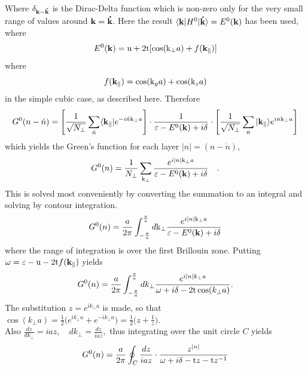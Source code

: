 \documentclass[a4paper, 12pt]{article}
\begin{document}
Where $\delta_{\bf k-\acute{k}}$ is the Dirac-Delta function which is non-zero only for the very small range of values around $\bf k = \acute{k}$. Here the result $\langle {\bf k}|H^0|{\bf \acute{k}} \rangle = E^0 ({\bf k}) $ has been used, where
\begin{equation}
	E^0 ({\bf k})={\rm{u}}+2{\rm{t}}[\cos({\rm{k}}_\perp a)+f({\bf k_\parallel})]
\end{equation}
where
\begin{equation}\label{disp}
	f({\bf k_\parallel}) = \cos({\rm{k}}_y a)+\cos({\rm{k}}_z a)
\end{equation}
in the simple cubic case, as described here. Therefore
\begin{equation}
	G^0(n - \acute{n}) = \left[ \frac{1}{\sqrt{N_\perp}}\sum_{\acute{n}} \langle{\bf k_\parallel}|e^{-i\acute{n}{\rm{k}}_\perp a}\right]\cdot \frac{1}{\varepsilon-E^0 ({\bf k}) +i\delta} \cdot \left[ \frac{1}{\sqrt{N_\perp}}\sum_n |{\bf k_\parallel}\rangle e^{in{\rm{k}}_\perp a}\right]
\end{equation}
which yields the Green's function for each layer $|n| = (n-\acute{n})$,
\begin{equation}
	G^0 (n) = \frac{1}{N_\perp}\sum_{{\rm{k}}_\perp} \frac{e^{i|n|{\rm{k}}_\perp a}}{\varepsilon-E^0 ({\bf k}) +i\delta} \quad .
\end{equation}
This is solved most conveniently by converting the summation to an integral and solving by contour integration.
\begin{equation}
	G^0 (n) = \frac{a}{2\pi}\int_{-\frac{\pi}{a}}^{\frac{\pi}{a}} {d{\rm{k}}_\perp} \frac{e^{i|n|{\rm{k}}_\perp a}}{\varepsilon-E^0 ({\bf k}) +i\delta}
\end{equation}
where the range of integration is over the first Brillouin zone. Putting $\omega = \varepsilon -{\rm u} -2{\rm t}f({\bf k_\parallel})$ yields
\begin{equation}
	G^0 (n) = \frac{a}{2\pi}\int_{-\frac{\pi}{a}}^{\frac{\pi}{a}} {dk_\perp} \frac{e^{i|n|k_\perp a}}{\omega +i\delta - 2{\rm t}\cos(k_\perp a)} .
\end{equation}
The substitution $z=e^{ik_\perp a}$ is made, so that $\cos(k_\perp a) = \frac{1}{2}\big(e^{ik_\perp a}+e^{-ik_\perp a}\big)= \frac{1}{2}\big(z +\frac{1}{z}\big)$.
\\Also $\frac{dz}{dk_\perp}=iaz , \quad dk_\perp =\frac{dz}{iaz},$ thus integrating over the unit circle $C$ yields
\begin{equation}
	G^0 (n) = \frac{a}{2\pi}\oint_C \frac{dz}{iaz}\cdot \frac{z^{|n|}}{\omega +i\delta - {\rm t}z-{\rm t}z^{-1}} 
\end{equation}
\end{document}
